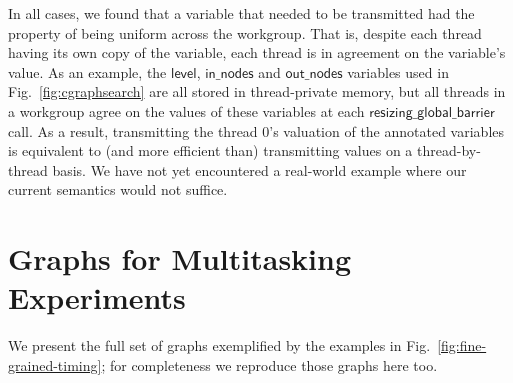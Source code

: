 \documentclass[parskip=half,sigconf,review, anonymous=true, acmcopyrightmode=none]{acmart}
\newcommand{\myfig}{Fig.~}
\newcommand{\resizingglobalbarrier}{\mathsf{resizing\_global\_barrier}}
\newcommand{\keyword}[1]{\mathsf{#1}}
\begin{document}
In all cases, we found that a variable that needed to be transmitted
had the property of being uniform across the workgroup.  That is,
despite each thread having its own copy of the variable, each thread
is in agreement on the variable's value.  As an example, the
$\keyword{level}$, $\keyword{in\_nodes}$ and $\keyword{out\_nodes}$
variables used in \myfig\ref{fig:cgraphsearch} are all stored in thread-private
memory, but all threads in a workgroup agree on the values of these
variables at each $\resizingglobalbarrier$ call.  As a result,
transmitting the thread 0's valuation of the annotated variables is
equivalent to (and more efficient than) transmitting values on a
thread-by-thread basis.  We have not yet encountered a real-world
example where our current semantics would not suffice.


\section{Graphs for Multitasking Experiments}\label{appendix:extragraphs}

We present the full set of graphs exemplified by the examples in
\myfig\ref{fig:fine-grained-timing}; for completeness we reproduce
those graphs here too.
\end{document}
